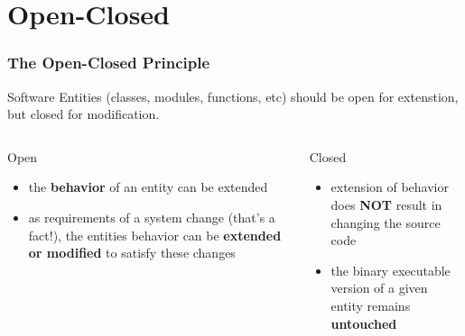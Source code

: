 \documentclass[9pt]{beamer}
\begin{document}
\section{Open-Closed}
\begin{frame}
  \frametitle{The Open-Closed Principle}
  \begin{theorem}
    Software Entities (classes, modules, functions, etc) should be open for extenstion, but closed for modification.
  \end{theorem}
\vfill
\pause
  \begin{columns}[t]
    \begin{column}{.48\textwidth}
       \begin{block}{Open}
         \begin{itemize}
         \item<3-> the \textbf{behavior} of an entity can be extended
         \item<3-> as requirements of a system change (that's a fact!), the entities behavior can be \textbf{extended or modified} to satisfy these changes
         \end{itemize}
       \end{block}
    \end{column}
\hfill
    \begin{column}{.48\textwidth}
       \begin{block}{Closed}
         \begin{itemize}
         \item<4-> extension of behavior does \textbf{NOT} result in changing the source code 
         \item<4-> the binary executable version of a given entity remains \textbf{untouched}
         \end{itemize}
      \end{block}
    \end{column}
  \end{columns}

\end{frame}
\end{document}
